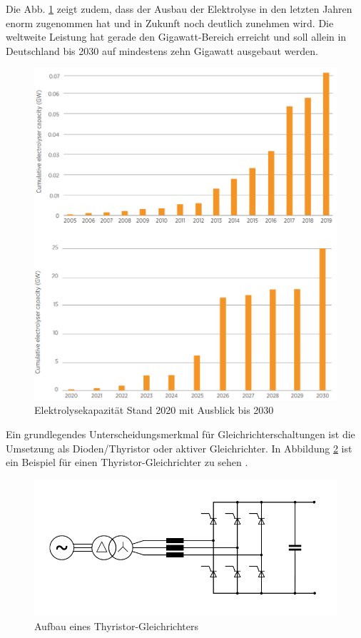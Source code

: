 Die Abb. \ref{fig:elycapacity} zeigt zudem, dass der Ausbau der Elektrolyse in den letzten Jahren enorm zugenommen hat und in Zukunft noch deutlich zunehmen wird. Die weltweite Leistung hat gerade den Gigawatt-Bereich erreicht und soll allein in Deutschland bis 2030 auf mindestens zehn Gigawatt ausgebaut werden.\\
	\begin{figure}[H]
		\centering
		\includegraphics[width=0.7\linewidth]{content/Grafiken/Ely_Capacity}
		\caption[Elektrolyse Kapazität bis 2030]{Elektrolysekapazität Stand 2020 mit Ausblick bis 2030 \cite{IRENA2020}}
		\label{fig:elycapacity}
	\end{figure}
Ein grundlegendes Unterscheidungsmerkmal für Gleichrichterschaltungen ist die Umsetzung als Dioden/Thyristor oder aktiver Gleichrichter. In Abbildung \ref{fig:thyristor} ist ein Beispiel für einen Thyristor-Gleichrichter zu sehen . 
	\begin{figure} [H]
		\centering
		\includegraphics[width=0.9\linewidth]{content/Grafiken/Thyristor}
		\caption{Aufbau eines Thyristor-Gleichrichters}
		\label{fig:thyristor}
	\end{figure}
